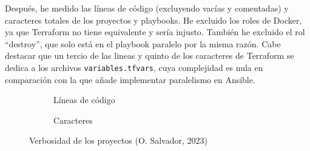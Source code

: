 \documentclass[11pt]{article}
\begin{document}
\begin{flushleft}
Después, he medido las líneas de código (excluyendo vacías y comentadas) y caracteres totales de los proyectos y playbooks. He excluido los roles de Docker, ya que Terraform no tiene equivalente y sería injusto. También he excluido el rol ``destroy'', que solo está en el playbook paralelo por la misma razón. Cabe destacar que un tercio de las lineas y quinto de los caracteres de Terraform se dedica a los archivos \texttt{variables.tfvars}, cuya complejidad es nula en comparación con la que añade implementar paralelismo en Ansible.
\linebreak

    \begin{figure}[htb]
        \centering
        \begin{subfigure}{0.48\textwidth}
            \caption{Líneas de código}
        \end{subfigure}
        \begin{subfigure}{0.45\textwidth}
            \caption{Caracteres}
        \end{subfigure}
        \caption{Verbosidad de los proyectos (O. Salvador, 2023)}
    \end{figure} 






\end{flushleft}
\end{document}
